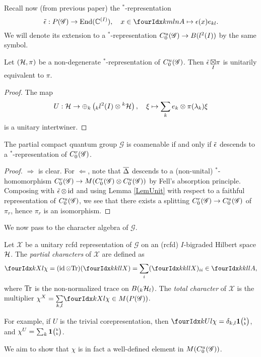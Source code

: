 Recall now (from previous paper) the $^*$-representation \[\weps: P(\mathscr{G}) \rightarrow \End(\C^{(I)}), \quad x\in \Gr{A}{k}{l}{m}{n}\mapsto \epsilon(x) e_{kl}.\] We will denote its extension to a $^*$-representation $C^{u}_{0}(\mathscr{G})\rightarrow B(l^2(I))$ by the same symbol.

\begin{Lem}\label{LemUnit} Let $(\mathcal{H},\pi)$ be a non-degenerate $^*$-representation of $C^{u}_{0}(\mathscr{G})$. Then $\operatorname{\tilde{\epsilon}}\underset{I}{\boxtimes} \pi$ is unitarily equivalent to $\pi$.
\end{Lem} 
\begin{proof} The map \[U: \mathcal{H} \rightarrow \oplus_k \left({}_kl^2(I)\otimes {}^k\mathcal{H}\right),\quad \xi \mapsto \sum_k e_k\otimes \pi(\lambda_k)\xi\] is a unitary intertwiner.
\end{proof} 

\begin{Prop} The partial compact quantum group $\mathscr{G}$ is coamenable if and only if $\operatorname{\tilde{\epsilon}}$ descends to a $^*$-representation of $C^{r}_{0}(\mathscr{G})$.
\end{Prop} 
\begin{proof} $\Rightarrow$ is clear. For $\Leftarrow$, note that $\overline{\Delta}$ descends to a (non-unital) $^*$-homomorphism $C^{r}_{0}(\mathscr{G})\rightarrow M(C^{r}_{0}(\mathscr{G})\otimes C^{u}_{0}(\mathscr{G}))$ by Fell's absorption principle. Composing with $\operatorname{\tilde{\epsilon}}\otimes \operatorname{id}$ and using Lemma \ref{LemUnit} with respect to a faithful representation of $C^{u}_{0}(\mathscr{G})$, we see that there exists a splitting $C^{r}_{0}(\mathscr{G})\rightarrow C^{u}_{0}(\mathscr{G})$ of $\pi_r$, hence $\pi_r$ is an isomorphism.
\end{proof}
 
We now pass to the character algebra of $\mathscr{G}$.
 
 \begin{Def} Let $\mathscr{X}$ be a unitary rcfd representation of $\mathscr{G}$ on an (rcfd) $I$-bigraded Hilbert space $\mathcal{H}$. The \emph{partial characters} of $\mathscr{X}$ are defined as \[\Gr{\chi}{}{X}{k}{l} = (\id\otimes \Tr)(\Gr{X}{k}{l}{k}{l}) = \sum_i(\Gr{X}{k}{l}{k}{l})_{ii} \in \Gr{A}{k}{l}{k}{l},\] where $\mathrm{Tr}$ is the non-normalized trace on $B({}_{k}\mathcal{H}_{l})$. The \emph{total character} of $\mathscr{X}$ is the multiplier $\chi^X  =\underset{k,l}{\sum} \Gr{\chi}{}{X}{k}{l}\in M(P(\mathscr{G}))$.
 \end{Def}
 
 For example, if $U$ is the trivial corepresentation, then $\Gr{\chi}{}{U}{k}{l} = \delta_{k,l}\UnitC{k}{k}$, and $\chi^U = \sum_k \mathbf{1}{\tiny {\begin{pmatrix} k\\k\end{pmatrix}}}$.
 
 We aim to show that $\chi$ is in fact a well-defined element in $M(C^{u}_{0}(\mathscr{G}))$. 
 
